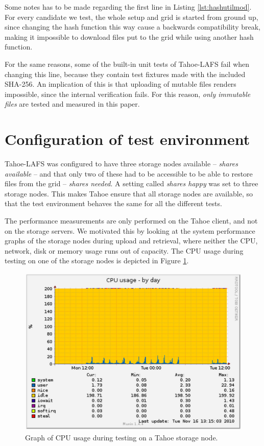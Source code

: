 \documentclass[english,12pt,a4paper]{book}
\begin{document}
Some notes has to be made regarding the first line in Listing
\ref{lst:hashutilmod}. For every candidate we test, the whole setup and grid is
started from ground up, since changing the hash function this way cause a
backwards compatibility break, making it impossible to download files put to the
grid while using another hash function.

For the same reasons, some of the built-in unit tests of Tahoe-LAFS fail when
changing this line, because they contain test fixtures made with the included
SHA-256.  An implication of this is that uploading of mutable files renders
impossible, since the internal verification fails. For this reason, \emph{only
immutable files} are tested and measured in this paper.

\section{Configuration of test environment}

Tahoe-\ac{LAFS} was configured to have three storage nodes available --
\emph{shares available} -- and that only two of these had to be accessible to be
able to restore files from the grid -- \emph{shares needed}. A setting called
\emph{shares happy} was set to three storage nodes. This makes Tahoe ensure that
all storage nodes are available, so that the test environment behaves the same
for all the different tests.

The performance measurements are only performed on the Tahoe client, and not on
the storage servers. We motivated this by looking at the system performance
graphs of the storage nodes during upload and retrieval, where neither the
\ac{CPU}, network, disk or memory usage runs out of capacity. The \ac{CPU} usage
during testing on one of the storage nodes is depicted in Figure
\ref{fig:munin:storagenode}.

\begin{figure}[h!]
    \centering
    \includegraphics[width=0.8\columnwidth]{munin-tahoe05-cpuday.png}
    \caption{Graph of CPU usage during testing on a Tahoe storage node.}
    \label{fig:munin:storagenode}
\end{figure}
\end{document}
